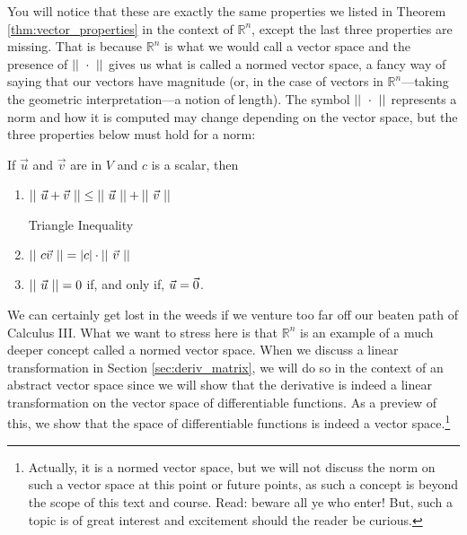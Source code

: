 You will notice that these are exactly the same properties we listed in Theorem \ref{thm:vector_properties} in the context of $\mathbb{R}^n$, except the last three properties are missing. That is because $\mathbb{R}^n$ is what we would call a vector space and the presence of $||\ \cdot\ ||$ gives us what is called a normed vector space, a fancy way of saying that our  vectors have magnitude (or, in the case of vectors in $\mathbb{R}^n$---taking the geometric interpretation---a notion of length).  The symbol $||\ \cdot\ ||$ represents a norm and how it is computed may change depending on the vector space, but the three properties below must hold for a norm:

{If $\vec u$ and $\vec v$ are in $V$ and $c$ is a scalar, then 
\begin{enumerate}
	\item \parbox{150pt}{$||\ \vec u+\vec v\ ||\leq ||\ \vec u\ ||+||\ \vec v\ ||$}Triangle Inequality
	\item	\parbox{150pt}{$||\ c\vec v\ || = |c|\cdot||\ \vec v\ ||$}\label{thm:norm_prop}
	\item	$||\ \vec u\ || = 0$ if, and only if, $\vec u = \vec 0$.  
\end{enumerate}
}

We can certainly get lost in the weeds if we venture too far off our beaten path of Calculus III.  What we want to stress here is that $\mathbb{R}^n$ is an example of a much deeper concept called a normed vector space.  When we discuss a linear transformation in Section \ref{sec:deriv_matrix}, we will do so in the context of an abstract vector space since we will show that the derivative is indeed a linear transformation on the vector space of differentiable functions.  As a preview of this, we show that the space of differentiable functions is indeed a vector space.\footnote{Actually, it is a normed vector space, but we will not discuss the norm on such a vector space at this point or future points, as such a concept is beyond the scope of this text and course.  Read: beware all ye who enter!  But, such a topic is of great interest and excitement should the reader be curious.}\\

